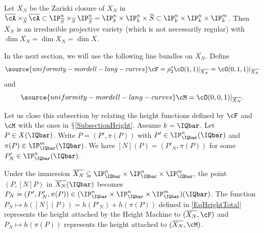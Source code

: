 Let $\overline{X_N}$ be the Zariski closure of $X_N$ in
$\overline{\cA}\times_{\overline{S}}\overline{\cA}\subset
\IP^n_{\overline{S}}\times_{\overline{S}}\IP^n_{\overline{S}} =
\IP_k^n\times\IP_k^n\times \overline{S}
\subset\IP_k^n\times\IP_k^n\times \IP_k^m$.  Then $\overline{X_N}$ is an irreducible projective variety (which is not necessarily regular) with $\dim \overline{X_N} = \dim X_N = \dim X$.

In the next section, we will use the following line bundles on $\overline{X_N}$. Define
\begin{equation}\label{def:cF}
\source{uniformity-mordell-lang-curves}
\cF = \rho_2^*\cO(1,1)|_{\overline{X_N}} = \cO(0,1,1)|_{\overline{X_N}}
\end{equation}
and
\begin{equation}\label{def:cM}
\source{uniformity-mordell-lang-curves}
  \cM %
  = \cO(0,0,1)|_{\overline{X_N}}.
\end{equation}

Let us close this subsection by relating the height functions defined
by $\cF$ and $\cM$ with the ones in
$\mathsection$\ref{SubsectionHeight}. Assume $k = \IQbar$. Let $P \in
X(\IQbar)$. Write $P = (P',\pi(P))$ with
 $P' \in \IP_\IQbar^n(\IQbar)$ and $\pi(P) \in\IP_\IQbar^m(\IQbar)$. %
We have $[N](P) = ( P'_N,\pi(P))$ for some $P'_N \in \IP_\IQbar^n(\IQbar)$.

Under the immersion $\overline{X_N} \subseteq \IP_\IQbar^n \times
\IP_\IQbar^n \times \IP_\IQbar^m$, the point $(P,[N]P)$ in
$\overline{X_N}(\IQbar)$ becomes $P_N=(P',P'_N,\pi(P)) \in
(\IP_\IQbar^n \times \IP_\IQbar^n \times \IP_\IQbar^m)(\IQbar)$.
The function $P_N\mapsto h([N](P)) = h(P'_N)+h(\pi(P))$ defined in
\eqref{EqHeightTotal}
represents the height attached by the Height Machine to
$(\overline{X_N},\cF)$
and $P_N\mapsto h(\pi(P))$ represents the height attached to $(\overline{X_N},\cM)$.




